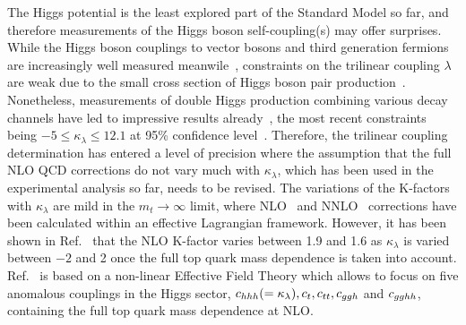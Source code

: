 The Higgs potential is the least explored part of the Standard Model so far, and therefore measurements of the Higgs boson self-coupling(s) may offer surprises.
While the Higgs boson couplings to vector bosons and third generation fermions are increasingly well measured meanwile~\cite{Khachatryan:2016vau,ATLAS:2018doi,CMS-PAS-HIG-17-031}, constraints on the trilinear coupling $\lambda$ are weak due to the small cross section of Higgs boson pair production~\cite{Glover:1987nx,Dawson:1998py,Baglio:2012np,Frederix:2014hta}.
Nonetheless, measurements of double Higgs production combining various decay channels have led to impressive results already~\cite{CMS-PAS-HIG-17-030,ATLAS-CONF-2018-043}, 
the most recent constraints being $-5\leq \kappa_\lambda\leq 12.1$
 at 95\% confidence level~\cite{ATLAS-CONF-2018-043}.
Therefore, the trilinear coupling determination has entered a level of precision where the assumption that the full NLO QCD corrections do not vary much with $\kappa_\lambda$, which has been used in the experimental analysis so far, needs to be revised.
The variations of the K-factors with $\kappa_\lambda$ are mild in the $m_t\to \infty$ limit, where NLO~\cite{Grober:2015cwa,Grober:2017gut} and NNLO~\cite{deFlorian:2017qfk} corrections have been calculated within an effective Lagrangian framework.
However, it has been shown in Ref.~\cite{Buchalla:2018yce} that the NLO K-factor varies between 1.9 and 1.6 as $\kappa_\lambda$ is varied between $-2$ and 2 once the full top quark mass dependence is taken into account. 
Ref.~\cite{Buchalla:2018yce} is based on a non-linear Effective Field Theory which allows to focus on five anomalous couplings in the Higgs sector, $c_{hhh}(=\kappa_\lambda), c_{t},c_{tt},c_{ggh}$ and $c_{gghh}$, containing the full top quark mass dependence at NLO.


